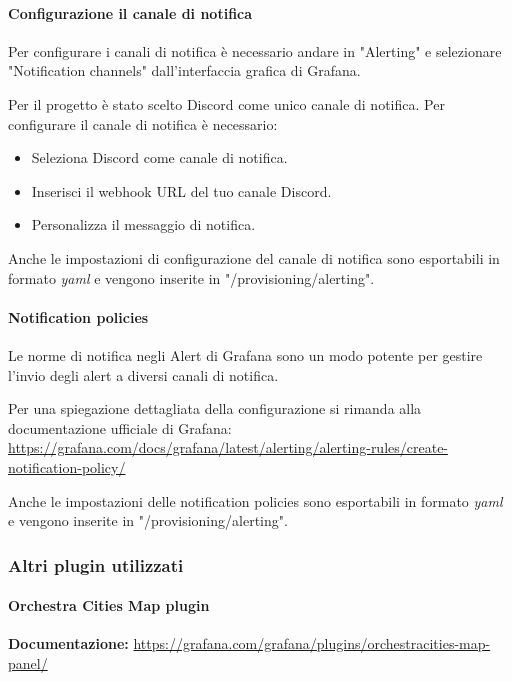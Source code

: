 \paragraph{Configurazione il canale di notifica}
Per configurare i canali di notifica è necessario andare in "Alerting" e selezionare "Notification channels" dall'interfaccia grafica di Grafana.

Per il progetto è stato scelto Discord come unico canale di notifica.
Per configurare il canale di notifica è necessario:
\begin{itemize}
    \item Seleziona Discord come canale di notifica.
    \item Inserisci il webhook URL del tuo canale Discord.
    \item Personalizza il messaggio di notifica.
\end{itemize}

Anche le impostazioni di configurazione del canale di notifica sono esportabili in formato \textit{yaml} e vengono inserite in "/provisioning/alerting".

\paragraph{Notification policies}
Le norme di notifica negli Alert di Grafana sono un modo potente per gestire l'invio degli alert a diversi canali di notifica.

Per una spiegazione dettagliata della configurazione si rimanda alla documentazione ufficiale di Grafana: \href{https://grafana.com/docs/grafana/latest/alerting/alerting-rules/create-notification-policy/}{https://grafana.com/docs/grafana/latest/alerting/alerting-rules/create-notification-policy/}

Anche le impostazioni delle notification policies sono esportabili in formato \textit{yaml} e vengono inserite in "/provisioning/alerting".

\subsubsection{Altri plugin utilizzati}
\paragraph{Orchestra Cities Map plugin}
\textbf{Documentazione:} \href{https://grafana.com/grafana/plugins/orchestracities-map-panel/}{https://grafana.com/grafana/plugins/orchestracities-map-panel/}

